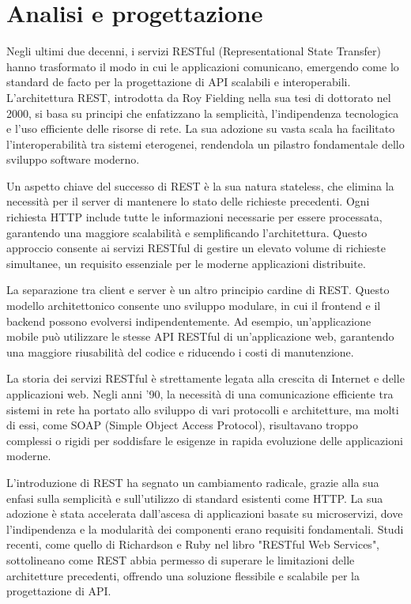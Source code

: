 \documentclass[a4paper,twoside,12pt]{toptesi}
\begin{document}
\chapter{Analisi e progettazione}

Negli ultimi due decenni, i servizi RESTful (Representational State Transfer) hanno trasformato il modo in cui le applicazioni comunicano, emergendo come lo standard de facto per la progettazione di API scalabili e interoperabili. L'architettura REST, introdotta da Roy Fielding nella sua tesi di dottorato nel 2000, si basa su principi che enfatizzano la semplicità, l'indipendenza tecnologica e l'uso efficiente delle risorse di rete. La sua adozione su vasta scala ha facilitato l'interoperabilità tra sistemi eterogenei, rendendola un pilastro fondamentale dello sviluppo software moderno.

Un aspetto chiave del successo di REST è la sua natura stateless, che elimina la necessità per il server di mantenere lo stato delle richieste precedenti. Ogni richiesta HTTP include tutte le informazioni necessarie per essere processata, garantendo una maggiore scalabilità e semplificando l'architettura. Questo approccio consente ai servizi RESTful di gestire un elevato volume di richieste simultanee, un requisito essenziale per le moderne applicazioni distribuite.

La separazione tra client e server è un altro principio cardine di REST. Questo modello architettonico consente uno sviluppo modulare, in cui il frontend e il backend possono evolversi indipendentemente. Ad esempio, un'applicazione mobile può utilizzare le stesse API RESTful di un'applicazione web, garantendo una maggiore riusabilità del codice e riducendo i costi di manutenzione.

La storia dei servizi RESTful è strettamente legata alla crescita di Internet e delle applicazioni web. Negli anni '90, la necessità di una comunicazione efficiente tra sistemi in rete ha portato allo sviluppo di vari protocolli e architetture, ma molti di essi, come SOAP (Simple Object Access Protocol), risultavano troppo complessi o rigidi per soddisfare le esigenze in rapida evoluzione delle applicazioni moderne.

L'introduzione di REST ha segnato un cambiamento radicale, grazie alla sua enfasi sulla semplicità e sull'utilizzo di standard esistenti come HTTP. La sua adozione è stata accelerata dall'ascesa di applicazioni basate su microservizi, dove l'indipendenza e la modularità dei componenti erano requisiti fondamentali. Studi recenti, come quello di Richardson e Ruby nel libro "RESTful Web Services", sottolineano come REST abbia permesso di superare le limitazioni delle architetture precedenti, offrendo una soluzione flessibile e scalabile per la progettazione di API.
\end{document}
